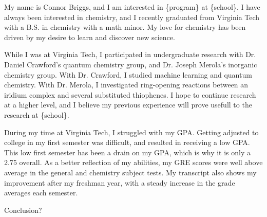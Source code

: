\documentclass[12pt]{article}
\begin{document}
My name is Connor Briggs, and I am interested in \{program\} at \{school\}. I have always been interested in chemistry, and I recently graduated from Virginia Tech with a B.S. in chemistry with a math minor. My love for chemistry has been driven by my desire to learn and discover new science.

While I was at Virginia Tech, I participated in undergraduate research with Dr. Daniel Crawford's quantum chemistry group, and Dr. Joseph Merola's inorganic chemistry group. With Dr. Crawford, I studied machine learning and quantum chemistry. With Dr. Merola, I investigated ring-opening reactions between an iridium complex and several substituted thiophenes. I hope to continue research at a higher level, and I believe my previous experience will prove usefull to the research at \{school\}. 

During my time at Virginia Tech, I struggled with my GPA. Getting adjusted to college in my first semester was difficult, and resulted in receiving a low GPA. This low first semester has been a drain on my GPA, which is why it is only a 2.75 overall. As a better reflection of my abilities, my GRE scores were well above average in the general and chemistry subject tests. My transcript also shows my improvement after my freshman year, with a steady increase in the grade averages each semester.

Conclusion?
\end{document}
